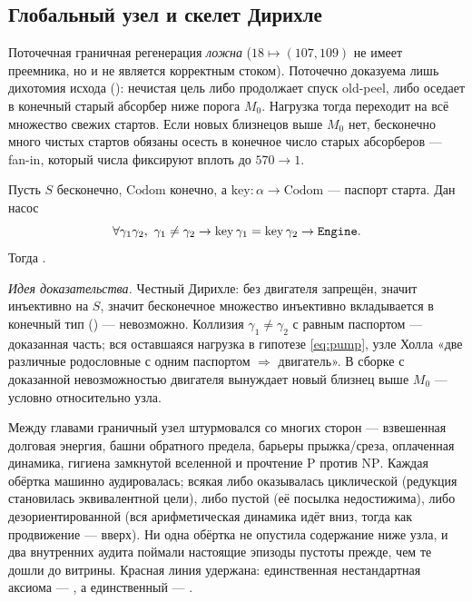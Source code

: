 \subsection{Глобальный узел и скелет Дирихле}

Поточечная граничная регенерация \emph{ложна} ($18\mapsto(107,109)$ не имеет преемника, но и не
является корректным стоком). Поточечно доказуема лишь дихотомия исхода
(): нечистая цель либо продолжает спуск old-peel, либо оседает в
конечный старый абсорбер ниже порога $M_0$. Нагрузка тогда переходит на всё множество свежих
стартов. Если новых близнецов выше $M_0$ нет, бесконечно много чистых стартов обязаны осесть в
конечное число старых абсорберов --- fan-in, который числа фиксируют вплоть до $570\to1$.

\begin{theorem}\label{thm:global_absorber_forces_engine}
Пусть $S$ бесконечно, $\mathrm{Codom}$ конечно, а $\mathrm{key}:\alpha\to\mathrm{Codom}$ --- паспорт
старта. Дан насос
\begin{equation}\label{eq:pump}
  \forall\gamma_1\gamma_2,\ \gamma_1\ne\gamma_2\to\mathrm{key}\,\gamma_1=\mathrm{key}\,\gamma_2\to\code{Engine}.
\end{equation}
Тогда .
\end{theorem}

\emph{Идея доказательства.} Честный Дирихле: без двигателя  запрещён, значит 
инъективно на $S$, значит бесконечное множество инъективно вкладывается в конечный тип
() --- невозможно. Коллизия $\gamma_1\ne\gamma_2$ с равным
паспортом --- \green{} доказанная часть; вся оставшаяся нагрузка в \red{} гипотезе \cref{eq:pump},
узле Холла «две различные родословные с одним паспортом $\Rightarrow$ двигатель». В сборке с
доказанной невозможностью двигателя  вынуждает новый
близнец выше $M_0$ --- условно относительно узла.

\begin{remark}
Между главами граничный узел штурмовался со многих сторон --- взвешенная долговая энергия, башни
обратного предела, барьеры прыжка/среза, оплаченная динамика, гигиена замкнутой вселенной и прочтение
$\mathrm{P}$ против $\mathrm{NP}$. Каждая обёртка машинно аудировалась; всякая либо оказывалась
циклической (редукция становилась эквивалентной цели), либо пустой (её посылка недостижима), либо
дезориентированной (вся арифметическая динамика идёт вниз, тогда как продвижение --- вверх). Ни одна
обёртка не опустила содержание ниже узла, и два внутренних аудита поймали настоящие эпизоды пустоты
прежде, чем те дошли до витрины. Красная линия удержана: единственная нестандартная аксиома ---
\axiom{}, а единственный  --- .
\end{remark}

